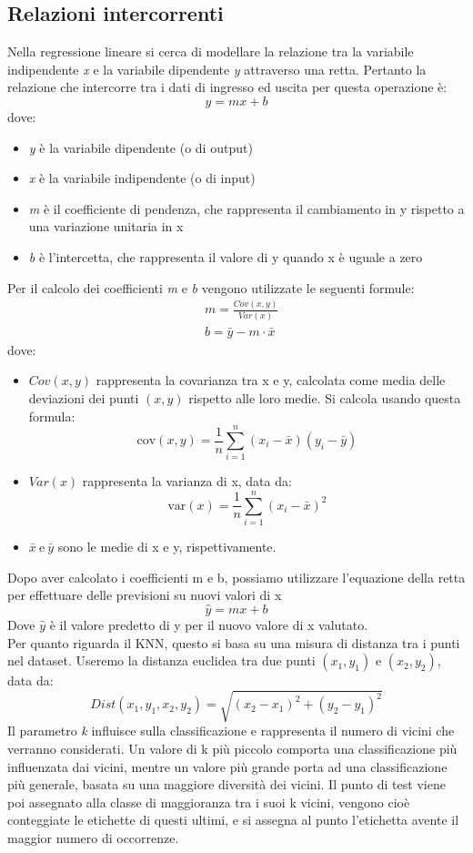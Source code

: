 \documentclass[11pt]{article}
\theoremstyle{definition}
\begin{document}
\subsection{Relazioni intercorrenti}
Nella regressione lineare si cerca di modellare la relazione tra la variabile indipendente \textit{x} e la variabile dipendente \textit{y} attraverso una retta. Pertanto la relazione che intercorre tra i dati di ingresso ed uscita per questa operazione è:
$$
y=mx+b
$$
dove:
\begin{itemize}
\item \textit{y} è la variabile dipendente (o di output)
\item \textit{x} è la variabile indipendente (o di input)
\item \textit{m} è il coefficiente di pendenza, che rappresenta il cambiamento in y rispetto a una variazione unitaria in x
\item \textit{b} è l'intercetta, che rappresenta il valore di y quando x è uguale a zero
\end{itemize}
Per il calcolo dei coefficienti \textit{m} e \textit{b} vengono utilizzate le seguenti formule:
\begin{align*}
&m = \frac{Cov(x,y)}{Var(x)}\\
&b=\bar{y}-m\cdot \bar{x}
\end{align*}
dove:
\begin{itemize}
\item $Cov(x,y)$ rappresenta la covarianza tra x e y, calcolata come media delle deviazioni dei punti $(x,y)$ rispetto alle loro medie. Si calcola usando questa formula:
$$
\text{cov}(x, y) = \frac{1}{n} \sum_{i=1}^{n} (x_i - \bar{x})(y_i - \bar{y})
$$
\item $Var(x)$ rappresenta la varianza di x, data da:
$$
\text{var}(x) = \frac{1}{n} \sum_{i=1}^{n} (x_i - \bar{x})^2
$$
\item $\bar{x} \ \text{e} \ \bar{y}$ sono le medie di x e y, rispettivamente.
\end{itemize}
Dopo aver calcolato i coefficienti m e b, possiamo utilizzare l'equazione della retta per effettuare delle previsioni su nuovi valori di x
$$
\hat{y} = mx+b
$$
Dove $\hat{y}$ è il valore predetto di y per il nuovo valore di x valutato.  \\
\newline
Per quanto riguarda il KNN, questo si basa su una misura di distanza tra i punti nel dataset. Useremo la distanza euclidea tra due punti $(x_1,y_1)$ e $(x_2,y_2)$, data da:
$$
Dist(x_1,y_1,x_2,y_2)=\sqrt{(x_2-x_1)^2 + (y_2-y_1)^2}
$$ 
Il parametro \textit{k} influisce sulla classificazione e rappresenta il numero di vicini che verranno considerati. Un valore di k più piccolo comporta una classificazione più influenzata dai vicini, mentre un valore più grande porta ad una classificazione più generale, basata su una maggiore diversità dei vicini. Il punto di test viene poi assegnato alla classe di maggioranza tra i suoi k vicini, vengono cioè conteggiate le etichette di questi ultimi, e si assegna al punto l'etichetta avente il maggior numero di occorrenze.
\end{document}
